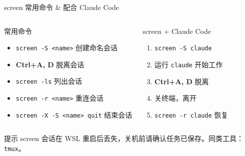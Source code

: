 \documentclass[aspectratio=169]{ctexbeamer}
\begin{document}
\begin{frame}{screen 常用命令 \& 配合 Claude Code}
\small

\begin{columns}[T]
\begin{block}{常用命令}
\begin{itemize}
  \setlength\itemsep{4pt}
  \item \texttt{screen -S <name>} \quad 创建命名会话
  \item \textbf{Ctrl+A, D} \quad 脱离会话
  \item \texttt{screen -ls} \quad 列出会话
  \item \texttt{screen -r <name>} \quad 重连会话
  \item \texttt{screen -X -S <name> quit} \quad 结束会话
\end{itemize}
\end{block}

\begin{exampleblock}{screen + Claude Code}
\begin{enumerate}
  \setlength\itemsep{4pt}
  \item \texttt{screen -S claude}
  \item 运行 \texttt{claude} 开始工作
  \item \textbf{Ctrl+A, D} 脱离
  \item 关终端，离开
  \item \texttt{screen -r claude} 恢复
\end{enumerate}
\end{exampleblock}
\end{columns}

\vspace{0.3cm}

\begin{alertblock}{提示}
  screen 会话在 WSL 重启后丢失，关机前请确认任务已保存。同类工具：\texttt{tmux}。
\end{alertblock}

\end{frame}
\end{document}
